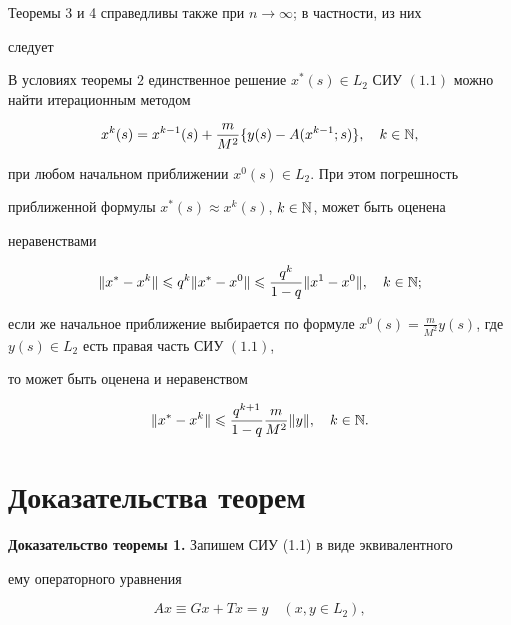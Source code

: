 Теоремы 3 и 4 справедливы также при $n\to \infty$; в частности, из них


следует





\begin{thm}


В условиях теоремы $2$ единственное решение $x^*(s)\in


L_2$ СИУ $(1.1)$ можно найти итерационным методом


$$


x^k(s) = x^{k-1}(s)+\frac{m}{M^2}\{y(s)-A(x^{k-


1};s)\},\quad k\in \N,


$$


при любом начальном приближении $x^0(s)\in L_2$. При этом погрешность


приближенной формулы $x^*(s)\approx x^k(s)$, $k\in \Bbb N$, может быть оценена


неравенствами


$$


\|x^*-x^k\|\lea q^k\|x^*-x^0\|\lea \frac{q^k}{1-q}\|x^1-x^0\|,\quad k\in


\N;


$$


если же начальное приближение выбирается по формуле $x^0(s) =


\frac{m}{M^2}y(s)$, где $y(s)\in L_2$ есть правая часть СИУ $(1.1)$,


то может быть оценена и неравенством


$$


\|x^*-x^k\|\lea \frac{q^{k+1}}{1-q}\frac{m}{M^2}\|y\|,\quad k\in \N.


$$


\end{thm}








\section{Доказательства теорем}





{\bf Доказательство теоремы 1.} Запишем СИУ (1.1) в виде эквивалентного


ему операторного уравнения


\begin{equation}


Ax \equiv Gx + Tx = y \quad (x,y\in L_2),


\end{equation}


